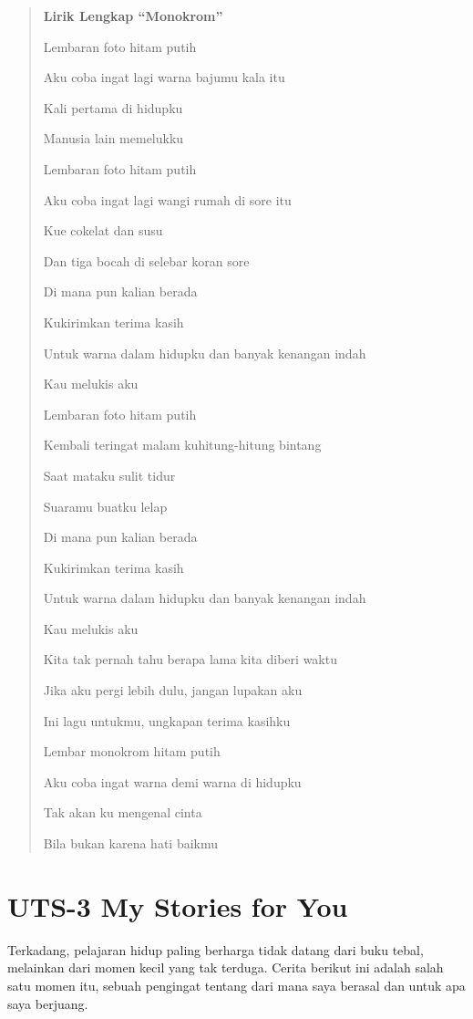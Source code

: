 \documentclass[
  letterpaper,
  DIV=11,
  numbers=noendperiod]{scrreprt}
\begin{document}
\begin{quote}
\textbf{Lirik Lengkap ``Monokrom''}

Lembaran foto hitam putih

Aku coba ingat lagi warna bajumu kala itu

Kali pertama di hidupku

Manusia lain memelukku

Lembaran foto hitam putih

Aku coba ingat lagi wangi rumah di sore itu

Kue cokelat dan susu

Dan tiga bocah di selebar koran sore

Di mana pun kalian berada

Kukirimkan terima kasih

Untuk warna dalam hidupku dan banyak kenangan indah

Kau melukis aku

Lembaran foto hitam putih

Kembali teringat malam kuhitung-hitung bintang

Saat mataku sulit tidur

Suaramu buatku lelap

Di mana pun kalian berada

Kukirimkan terima kasih

Untuk warna dalam hidupku dan banyak kenangan indah

Kau melukis aku

Kita tak pernah tahu berapa lama kita diberi waktu

Jika aku pergi lebih dulu, jangan lupakan aku

Ini lagu untukmu, ungkapan terima kasihku

Lembar monokrom hitam putih

Aku coba ingat warna demi warna di hidupku

Tak akan ku mengenal cinta

Bila bukan karena hati baikmu
\end{quote}


\chapter{UTS-3 My Stories for You}\label{uts-3-my-stories-for-you}

Terkadang, pelajaran hidup paling berharga tidak datang dari buku tebal,
melainkan dari momen kecil yang tak terduga. Cerita berikut ini adalah
salah satu momen itu, sebuah pengingat tentang dari mana saya berasal
dan untuk apa saya berjuang.
\end{document}
